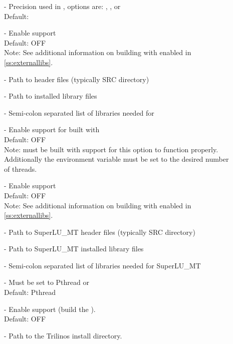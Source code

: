\begin{description}
\item[] -
  Precision used in {\sundials}, options are: , , or 
  \\
  Default: 
\item[] -
  Enable {\superludist} support
  \\
  Default: OFF
  \\
  Note: See additional information on building with {\superludist} enabled
  in \ref{ss:externallibs}.
\item[] -
  Path to {\superludist} header files (typically SRC directory)
\item[] -
  Path to {\superludist} installed library files
\item[] -
  Semi-colon separated list of libraries needed for {\superludist}
\item[] -
  Enable {\sundials} support for {\superludist} built with {\openmp}
  \\
  Default: OFF
  \\
  Note: {\superludist} must be built with {\openmp} support for this option to function
  properly. Additionally the environment variable  must be set to
  the desired number of threads.
\item[] -
  Enable {\superlumt} support
  \\
  Default: OFF
  \\
  Note: See additional information on building with {\superlumt} enabled
  in \ref{ss:externallibs}.
\item[] -
  Path to SuperLU\_MT header files (typically SRC directory)
\item[] -
  Path to SuperLU\_MT installed library files
\item[] -
  Semi-colon separated list of libraries needed for SuperLU\_MT
\item[] -
  Must be set to Pthread or {\openmp}
  \\
  Default: Pthread
\item[] -
  Enable {\trilinos} support (build the {\tpetra} {\nvector}).
  \\
  Default: OFF
\item[] -
  Path to the Trilinos install directory.

\end{description}
